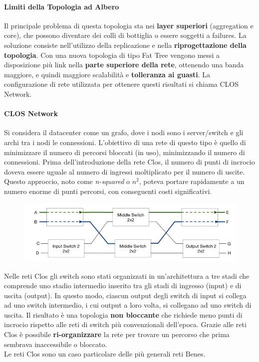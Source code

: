 \documentclass{article}
\begin{document}
		\paragraph{Limiti della Topologia ad
		Albero}\label{limiti-della-topologia-ad-albero}
		Il principale problema di questa topologia sta nei \textbf{layer
		superiori} (aggregation e core), che possono diventare dei colli di bottiglia o essere soggetti a failures. La soluzione consiste nell'utilizzo della replicazione e nella \textbf{riprogettazione della topologia}. Con una nuova topologia di tipo Fat Tree vengono messi a disposizione più link nella \textbf{parte superiore della rete}, ottenendo una banda maggiore, e quindi maggiore scalabilità e \textbf{tolleranza ai guasti}. La configurazione di rete utilizzata per ottenere	questi risultati si chiama CLOS Network.\\
		
		\paragraph{CLOS Network}
		Si considera il datacenter come	un grafo, dove i nodi sono i server/switch e gli	archi tra i nodi le connessioni. L'obiettivo di una rete di questo tipo è quello di minimizzare il numero di percorsi bloccati (in uso), minimizzando il numero di connessioni. Prima dell'introduzione della rete Clos, il numero di punti di incrocio doveva essere uguale al numero di ingressi moltiplicato per il numero di uscite. Questo approccio, noto come \textit{n-squared} o \textit{$n^2$}, poteva portare rapidamente a un numero enorme di punti percorsi, con conseguenti costi significativi.\\
		\begin{figure}[ht]
			\centering
			\includegraphics[width=0.5\linewidth]{images/SAC_B7_clos}
		\end{figure}
		Nelle reti Clos gli switch sono stati organizzati in un'architettura a tre stadi che comprende uno stadio intermedio inserito tra gli stadi di ingresso (input) e di uscita (output). In questo modo, ciascun output degli switch di input si collega ad uno switch intermedio, i cui output a loro volta, si collegano ad uno switch di uscita. Il risultato è una topologia \textbf{non bloccante} che richiede meno punti di incrocio rispetto alle reti di switch più convenzionali dell'epoca. Grazie alle reti Clos è possibile \textbf{ri-organizzare} la rete per trovare un percorso che prima sembrava inaccessibile o bloccato.\\
		Le reti Clos sono un caso particolare delle più generali reti Benes.
		
\end{document}
